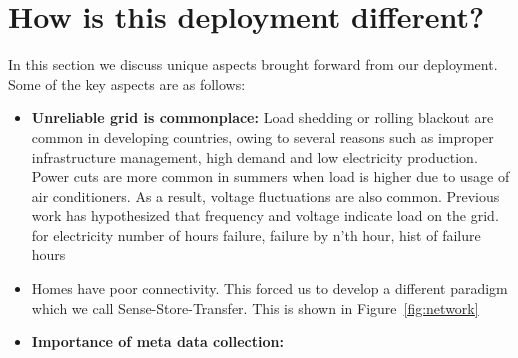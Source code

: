 \documentclass[10pt]{sensys-proc}
\newcommand{\figref}[1]{Figure~\ref{#1}}
\begin{document}
\section{How is this deployment different?}
\label{sec:learning}
In this section we discuss unique aspects brought forward from our deployment. Some of the key aspects are as follows:
\begin{itemize}

\item \textbf{Unreliable grid is commonplace:} Load shedding or rolling blackout are common in developing countries, owing to several reasons such as improper infrastructure management, high demand and low electricity production. Power cuts are more common in summers when load is higher due to usage of air conditioners. As a result, voltage fluctuations are also common. Previous work \cite{nplug} has hypothesized that frequency and voltage indicate load on the grid. 
for electricity number of hours failure, failure by n'th hour, hist of failure hours
\item Homes have poor connectivity. This forced us to develop a different paradigm which we call Sense-Store-Transfer. This is shown in \figref{fig:network}

\item \textbf{Importance of meta data collection:}


\end{itemize}
\end{document}
